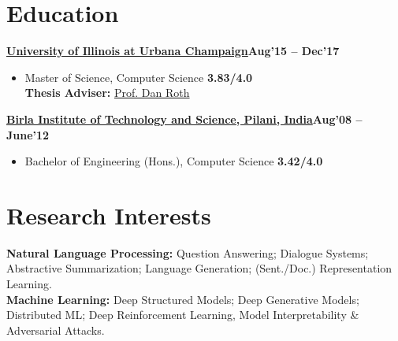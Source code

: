\documentclass[margin,line]{templates/resume}
\newcommand{\compresslist}{%
\setlength{\itemsep}{3pt}%
\setlength{\parskip}{0pt}%
\setlength{\parsep}{0pt}%
}
\begin{document}
\begin{resume}
\section{\mysidestyle Education}
    \textbf{\href{https://cs.illinois.edu/}{University of Illinois at Urbana Champaign}}\hfill {\textbf{Aug'15 -- Dec'17}}
    \begin{itemize}[leftmargin=*]\compresslist
        \item[]Master of Science, Computer Science \hfill {\textbf{3.83/4.0}}\\
    \textbf{Thesis Adviser:} \href{http://www.cis.upenn.edu/~danroth/}{Prof. Dan Roth}
    \end{itemize}
    \vspace{-0.2cm}
    \textbf{\href{http://www.bits-pilani.ac.in/}{Birla Institute of Technology and Science, Pilani, India}}\hfill{\textbf{Aug'08 -- June'12}}
    \begin{itemize}[leftmargin=*]\compresslist
        \item[]Bachelor of Engineering (Hons.), Computer Science \hfill{\textbf{3.42/4.0}}
    \end{itemize}

\vspace{-0.1cm}    
\section{\mysidestyle Research Interests}


\textbf{Natural Language Processing:} Question Answering; Dialogue Systems; Abstractive Summarization; Language Generation; (Sent./Doc.) Representation Learning. \\
\textbf{Machine Learning:} Deep Structured Models; Deep Generative Models; Distributed ML; Deep Reinforcement Learning, Model Interpretability \& Adversarial Attacks.


\end{resume}
\end{document}
